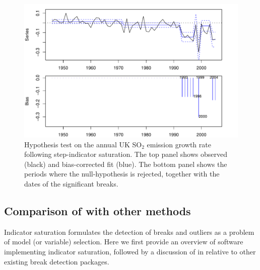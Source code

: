 \documentclass[article,nojss]{jss}
\begin{document}
\begin{figure}[t!]
  \centering
  \includegraphics[scale=0.4]{fig_sis_test.pdf}
  \caption{Hypothesis test on the annual UK SO$_2$ emission growth
    rate following step-indicator saturation. The top panel shows observed
    (black) and bias-corrected fit (blue). The bottom panel shows the
    periods where the null-hypothesis is rejected, together with the
    dates of the significant breaks. \label{fig_sistest} }
\end{figure}

\subsection[Comparison of isat with other methods]{Comparison of  with other methods}
\label{sec:isat_comp}

Indicator saturation formulates the detection of breaks and outliers as a problem of model (or variable) selection. Here we first provide an overview of software implementing indicator saturation, followed by a discussion of  in  relative to other existing break detection packages.
\end{document}
